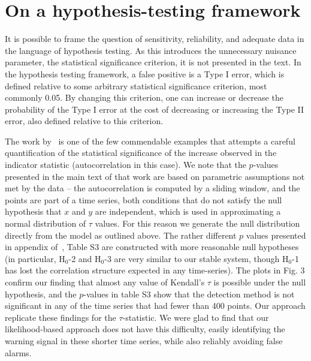 \documentclass[11pt]{elsarticle}
\begin{document}
\pagebreak

\section{On a hypothesis-testing framework}\label{Dakos}
It is possible to frame the question of sensitivity, reliability, and adequate data in the language of hypothesis testing. As this introduces the unnecessary nuisance parameter, the statistical significance criterion, it is not presented in the text.  In the hypothesis testing framework, a false positive is a Type I error, which is defined relative to some arbitrary statistical significance criterion, most commonly 0.05.  By changing this criterion, one can increase or decrease the probability of the Type I error at the cost of decreasing or increasing the Type II error, also defined relative to this criterion.  

The work by~\citet{Dakos2008} is one of the few commendable examples that attempts a careful quantification of the statistical significance of the increase observed in the indicator statistic (autocorrelation in this case).  We note that the $p$-values presented in the main text of that work are based on parametric assumptions not met by the data -- the autocorrelation is computed by a sliding window, and the points are part of a time series, both conditions that do not satisfy the null hypothesis that $x$ and $y$ are independent, which is used in approximating a normal distribution of $\tau$ values.  For this reason we generate the null distribution directly from the model as outlined above.   The rather different $p$ values presented in appendix of~\citet{Dakos2008}, Table S3 are constructed with more reasonable null hypotheses (in particular, H$_0$-2 and H$_0$-3 are very similar to our stable system, though H$_0$-1 has lost the correlation structure expected in any time-series).  The plots in Fig. 3 confirm our finding that almost any value of Kendall's $\tau$ is possible under the null hypothesis, and the $p$-values in table S3 show that the detection method is not significant in any of the time series that had fewer than 400 points.  Our approach replicate these findings for the $\tau$-statistic.  We were glad to find that our likelihood-based approach does not have this difficulty, easily identifying the warning signal in these shorter time series, while also reliably avoiding false alarms.  
\end{document}

